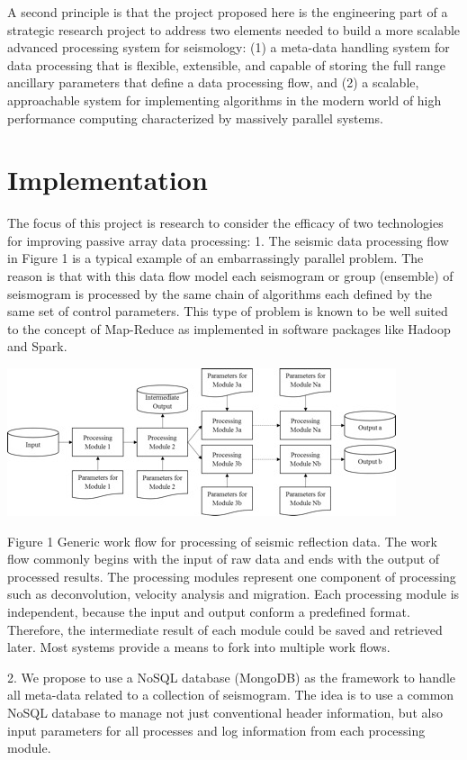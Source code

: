 \documentclass{acm_proc_article-sp}
\begin{document}
A second principle is that the project proposed here is the engineering part of a strategic research project to address two elements needed to build a more scalable advanced processing system for seismology: (1) a meta-data handling system for data processing that is flexible, extensible, and capable of storing the full range ancillary parameters that define a data processing flow, and (2) a scalable, approachable system for implementing algorithms in the modern world of high performance computing characterized by massively parallel systems.


\section{Implementation}

The focus of this project is research to consider the efficacy of two technologies for improving passive array data processing:
1.	The seismic data processing flow in Figure 1 is a typical example of an embarrassingly parallel problem.  The reason is that with this data flow model each seismogram or group (ensemble) of seismogram is processed by the same chain of algorithms each defined by the same set of control parameters.  This type of problem is known to be well suited to the concept of Map-Reduce as implemented in software packages like Hadoop and Spark.  

\includegraphics[scale=0.5]{Picture1}

Figure 1 Generic work flow for processing of seismic reflection data. The work flow commonly begins with the input of raw data and ends with the output of processed results. The processing modules represent one component of processing such as deconvolution, velocity analysis and migration.  Each processing module is independent, because the input and output conform a predefined format.  Therefore, the intermediate result of each module could be saved and retrieved later.  Most systems provide a means to fork into multiple work flows.  

2.	We propose to use a NoSQL database (MongoDB) as the framework to handle all meta-data related to a collection of seismogram.  The idea is to use a common NoSQL database to manage not just conventional header information, but also input parameters for all processes and log information from each processing module. 
\end{document}
